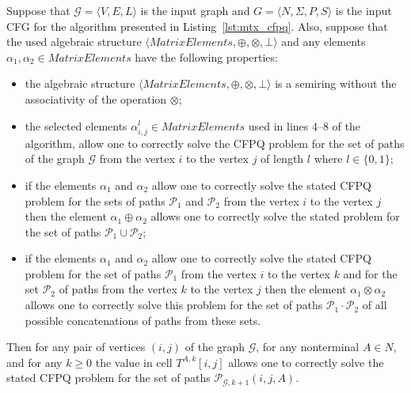 \begin{lemma}\label{lemma:correct_mtx}
	Suppose that $\mathcal{G} = \langle V, E, L \rangle$ is the input graph and $G =\langle N, \Sigma, P, S \rangle$ is the input CFG for the algorithm presented in Listing~\ref{lst:mtx_cfpq}. Also, suppose that the used algebraic structure $\langle \textit{MatrixElements}, \oplus, \otimes, \bot \rangle$ and any elements $\alpha_1, \alpha_2 \in \textit{MatrixElements}$ have the following properties:
	\begin{itemize}
	    \item the algebraic structure $\langle \textit{MatrixElements}, \oplus, \otimes, \bot \rangle$ is a semiring without the associativity of the operation $\otimes$;
	    \item the selected elements $\alpha^l_{i, j} \in \textit{MatrixElements}$ used in lines 4--8 of the algorithm, allow one to correctly solve the CFPQ problem for the set of paths of the graph $\mathcal{G}$ from the vertex $i$ to the vertex $j$ of length $l$ where $l \in \{0, 1\}$;
	    \item if the elements $\alpha_1$ and $\alpha_2$ allow one to correctly solve the stated CFPQ problem for the sets of paths $\mathcal{P}_1$ and $\mathcal{P}_2$ from the vertex $i$ to the vertex $j$ then the element $\alpha_1 \oplus \alpha_2$ allows one to correctly solve the stated problem for the set of paths $\mathcal{P}_1 \cup \mathcal{P}_2$;
	    \item if the elements $\alpha_1$ and $\alpha_2$ allow one to correctly solve the stated CFPQ problem for the set of paths $\mathcal{P}_1$ from the vertex $i$ to the vertex $k$ and for the set $\mathcal{P}_2$ of paths from the vertex $k$ to the vertex $j$ then the element $\alpha_1 \otimes \alpha_2$ allows one to correctly solve this problem for the set of paths $\mathcal{P}_1 \cdot \mathcal{P}_2$ of all possible concatenations of paths from these sets.
	\end{itemize}
	Then for any pair of vertices $(i, j)$ of the graph $\mathcal{G}$, for any nonterminal $A \in N$, and for any $k \geq 0$ the value in cell $T^{A, k} [i, j]$ allows one to correctly solve the stated CFPQ problem for the set of paths $\mathcal{P}_{\mathcal{G}, k + 1}(i, j, A)$.
\end{lemma}
